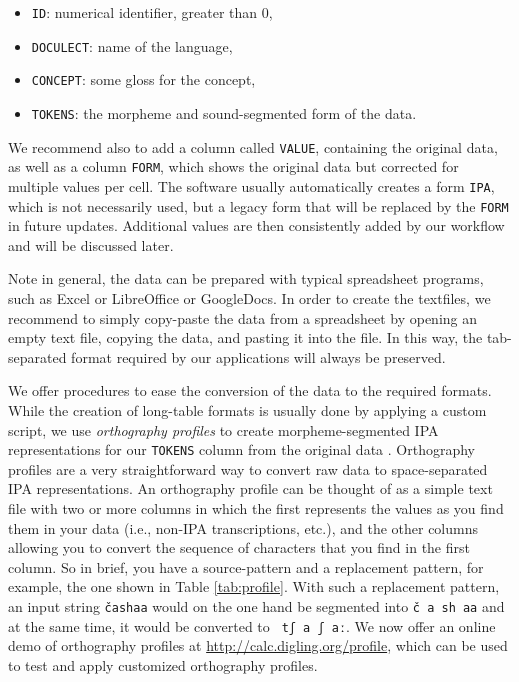 \documentclass[xetex,svgnames]{scrartcl}
\begin{document}
\begin{itemize}
  \item \texttt{ID}: numerical identifier, greater than 0,
  \item \texttt{DOCULECT}: name of the language,
  \item \texttt{CONCEPT}: some gloss for the concept,
  \item \texttt{TOKENS}: the morpheme and sound-segmented form of the data.
\end{itemize}

We recommend also to add a column called \texttt{VALUE}, containing the original data, as well as a
column \texttt{FORM}, which shows the original data but corrected for multiple values per cell. The
software usually automatically creates a form \texttt{IPA}, which is not necessarily used, but a
legacy form that will be replaced by the \texttt{FORM} in future updates.
Additional values are then consistently added by our workflow and will be discussed later.
 
Note in general, the data can be prepared with typical spreadsheet programs, such as Excel or
LibreOffice or GoogleDocs. In order to create the textfiles, we recommend to simply copy-paste the
data from a spreadsheet by opening an empty text file, copying the data, and pasting it into the
file. In this way, the tab-separated format required by our applications will always be preserved.
 
We offer procedures to ease the conversion of the data to the required formats. While the creation
of long-table formats is usually done by applying a custom script, we use \emph{orthography
profiles} to create morpheme-segmented IPA representations for our \texttt{TOKENS} column from the
original data \citep{Moran2018}. Orthography profiles are a very straightforward way to convert raw
data to space-separated IPA representations. An orthography profile can be thought of as a simple text file with two or more columns in which the first
represents the values as you find them in your data (i.e., non-IPA transcriptions, etc.), and the other
columns allowing you to convert the sequence of characters that you find in the first column. So in brief,
you have a source-pattern and a replacement pattern, for example, the one shown in Table
\ref{tab:profile}. With such a replacement pattern, an input string \texttt{čashaa} would on the one
hand be segmented into \texttt{č a sh aa} and at the same time, it would be converted to \texttt{ tʃ
a ʃ aː}. We now offer an online demo of orthography profiles at
\url{http://calc.digling.org/profile}, which can be used to test and apply customized orthography
profiles.
\end{document}
